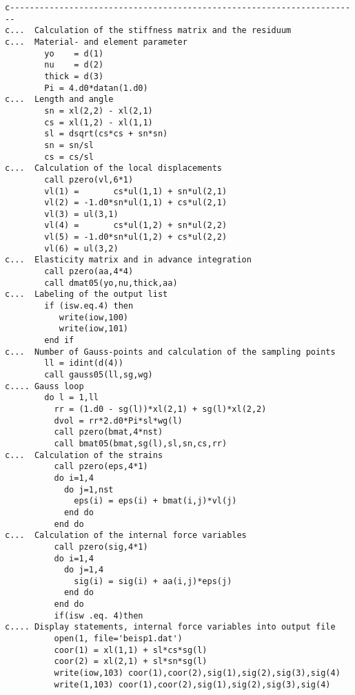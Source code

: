{\begin{verbatim}
c-----------------------------------------------------------------------
c...  Calculation of the stiffness matrix and the residuum 
c...  Material- and element parameter
        yo    = d(1)
        nu    = d(2)
        thick = d(3)
        Pi = 4.d0*datan(1.d0)
c...  Length and angle
        sn = xl(2,2) - xl(2,1)
        cs = xl(1,2) - xl(1,1)
        sl = dsqrt(cs*cs + sn*sn)
        sn = sn/sl
        cs = cs/sl
c...  Calculation of the local displacements
        call pzero(vl,6*1)
        vl(1) =       cs*ul(1,1) + sn*ul(2,1)
        vl(2) = -1.d0*sn*ul(1,1) + cs*ul(2,1)
        vl(3) = ul(3,1)
        vl(4) =       cs*ul(1,2) + sn*ul(2,2)
        vl(5) = -1.d0*sn*ul(1,2) + cs*ul(2,2)
        vl(6) = ul(3,2)
c...  Elasticity matrix and in advance integration
        call pzero(aa,4*4)
        call dmat05(yo,nu,thick,aa)
c...  Labeling of the output list
        if (isw.eq.4) then
           write(iow,100)
           write(iow,101)
        end if
c...  Number of Gauss-points and calculation of the sampling points
        ll = idint(d(4))
        call gauss05(ll,sg,wg)
c.... Gauss loop
        do l = 1,ll
          rr = (1.d0 - sg(l))*xl(2,1) + sg(l)*xl(2,2)
          dvol = rr*2.d0*Pi*sl*wg(l)
          call pzero(bmat,4*nst)
          call bmat05(bmat,sg(l),sl,sn,cs,rr)
c...  Calculation of the strains
          call pzero(eps,4*1)
          do i=1,4
            do j=1,nst
              eps(i) = eps(i) + bmat(i,j)*vl(j)
            end do
          end do
c...  Calculation of the internal force variables
          call pzero(sig,4*1)
          do i=1,4
            do j=1,4
              sig(i) = sig(i) + aa(i,j)*eps(j)
            end do
          end do
          if(isw .eq. 4)then
c.... Display statements, internal force variables into output file
          open(1, file='beisp1.dat')
          coor(1) = xl(1,1) + sl*cs*sg(l)
          coor(2) = xl(2,1) + sl*sn*sg(l)
          write(iow,103) coor(1),coor(2),sig(1),sig(2),sig(3),sig(4)
          write(1,103) coor(1),coor(2),sig(1),sig(2),sig(3),sig(4)


\end{verbatim}}
